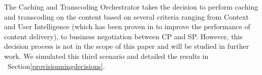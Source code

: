 The Caching and Transcoding Orchestrator takes the decision to perform caching and transcoding on the content based on several criteria ranging from Context and User Intelligence (which has been proven in \cite{wang_cpcdn:_2015} to improve the performance of content delivery), to business negotiation between CP and SP.
However, this decision process is not in the scope of this paper and will be studied in further work. 
We simulated this third scenario and detailed the results in ~Section\ref{provisionningdecisions}.


%
%
